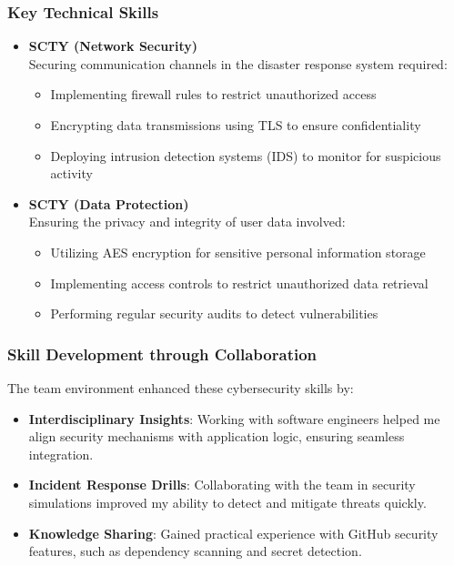 \documentclass[a4paper, 11pt]{report}
\begin{document}
\subsubsection{Key Technical Skills}
\begin{itemize}
    \item \textbf{SCTY (Network Security)} \\
    Securing communication channels in the disaster response system required:
    \begin{itemize}
        \item Implementing firewall rules to restrict unauthorized access
        \item Encrypting data transmissions using TLS to ensure confidentiality
        \item Deploying intrusion detection systems (IDS) to monitor for suspicious activity
    \end{itemize}

    \item \textbf{SCTY (Data Protection)} \\
    Ensuring the privacy and integrity of user data involved:
    \begin{itemize}
        \item Utilizing AES encryption for sensitive personal information storage
        \item Implementing access controls to restrict unauthorized data retrieval
        \item Performing regular security audits to detect vulnerabilities
    \end{itemize}
\end{itemize}

\subsubsection{Skill Development through Collaboration}
The team environment enhanced these cybersecurity skills by:
\begin{itemize}
    \item \textbf{Interdisciplinary Insights}: Working with software engineers helped me align security mechanisms with application logic, ensuring seamless integration.
    \item \textbf{Incident Response Drills}: Collaborating with the team in security simulations improved my ability to detect and mitigate threats quickly.
    \item \textbf{Knowledge Sharing}: Gained practical experience with GitHub security features, such as dependency scanning and secret detection.
\end{itemize}
\end{document}
